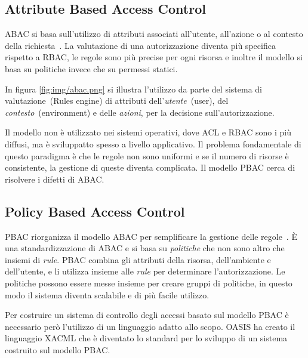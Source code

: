 \subsection*{Attribute Based Access Control}
\label{sub:ABAC}
\ac{ABAC} si basa sull'utilizzo di attributi associati all'utente, all'azione o al contesto
della richiesta~\cite{ABAC}. La valutazione di una autorizzazione diventa più specifica rispetto a \ac{RBAC},
le regole sono più precise per ogni risorsa e inoltre il modello si basa su politiche invece che su permessi statici.

In figura \ref{fig:img/abac.png} si illustra l'utilizzo da parte del sistema di valutazione~(Rules engine) di
attributi dell'\emph{utente}~(user), del \emph{contesto}~(environment) e delle \emph{azioni}, per la decisione
sull'autorizzazione.

Il modello non è utilizzato nei sistemi operativi, dove \ac{ACL} e \ac{RBAC} sono i più diffusi, ma è sviluppatto
spesso a livello applicativo. Il problema fondamentale di questo paradigma è che le regole non sono uniformi e se il numero
di risorse è consistente, la gestione di queste diventa complicata. Il modello \acf{PBAC} cerca di
risolvere i difetti di \ac{ABAC}.
\subsection*{Policy Based Access Control}
\label{sub:PBAC}
\ac{PBAC} riorganizza il modello \ac{ABAC} per semplificare la gestione delle regole~\cite{NISTACM}.
\MakeUppercase{è} una standardizzazione di \ac{ABAC} e si basa su \emph{politiche} che non sono altro che insiemi di \emph{rule}.
\ac{PBAC} combina gli attributi della risorsa, dell'ambiente e dell'utente, e li utilizza insieme alle \emph{rule} per
determinare l'autorizzazione.
Le politiche possono essere messe insieme per creare gruppi di politiche, in questo modo il sistema diventa scalabile e di
più facile utilizzo.\par
Per costruire un sistema di controllo degli accessi basato sul modello \ac{PBAC} è necessario però l'utilizzo di
un linguaggio adatto allo scopo. \ac{OASIS} ha creato il linguaggio \ac{XACML} che è diventato lo standard per lo sviluppo di un sistema costruito sul modello PBAC.
